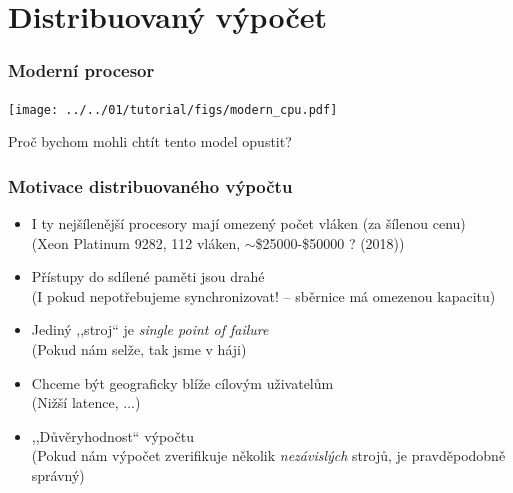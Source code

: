 \documentclass[usenames,dvipsnames,9pt]{beamer}
\begin{document}
%

\section{Distribuovaný výpočet}

\begin{frame}
\frametitle{Moderní procesor}
  \centering
  \texttt{[image: ../../01/tutorial/figs/modern\_cpu.pdf]}

  \pause\vspace{1.5em}
  \Large Proč bychom mohli chtít tento model opustit?


\end{frame}

\begin{frame}
  \frametitle{Motivace distribuovaného výpočtu}

  \begin{itemize}
    \pause\item I ty nejšílenější procesory mají omezený počet vláken (za šílenou cenu) \\
                {\small (Xeon Platinum 9282, 112 vláken, $\sim$\$25000-\$50000 ? (2018))}

    \pause\item Přístupy do sdílené paměti jsou drahé \\
                {\small (I pokud nepotřebujeme synchronizovat! -- sběrnice má omezenou kapacitu)} \\[1.25em]

    \pause\item Jediný ,,stroj`` je \emph{single point of failure} \\
                {\small (Pokud nám selže, tak jsme v háji)}

    \pause\item Chceme být geograficky blíže cílovým uživatelům \\
                {\small (Nižší latence, ...)}
    \pause\item ,,Důvěryhodnost`` výpočtu \\
                {\small (Pokud nám výpočet zverifikuje několik \emph{nezávislých} strojů, je pravděpodobně správný)}
  \end{itemize}
\end{frame}
\end{document}
